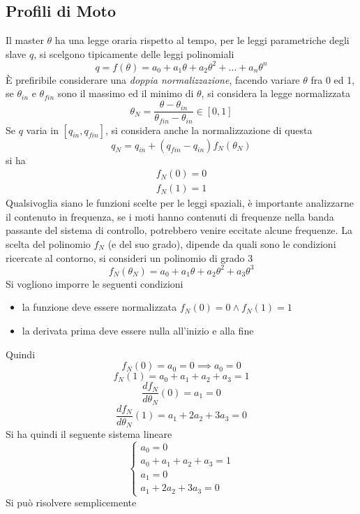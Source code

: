 \documentclass[10pt, letterpaper]{report}
\begin{document}
\subsection{Profili di Moto}
Il master $\theta$ ha una legge oraria rispetto al tempo, per le leggi parametriche degli slave $q$, si scelgono tipicamente delle leggi polinomiali 
$$q=f(\theta)=a_0+a_1\theta+a_2\theta^2+\dots + a_n\theta^n $$
È prefiribile considerare una \textit{doppia normalizzazione}, facendo variare $\theta$ fra 0 ed 1, se $\theta_{in}$ e $\theta_{fin}$ sono il massimo ed il minimo di $\theta$, si considera la legge normalizzata 
$$ \theta_N = \frac{\theta - \theta_{in}}{\theta_{fin}-\theta_{in}}\in [0,1]$$
Se $q$ varia in $[q_{in},q_{fin}]$, si considera anche la normalizzazione di questa 
$$ q_N=q_{in}+(q_{fin}-q_{in})f_N(\theta_N)$$
si ha 
$$\begin{matrix}
    f_N(0)=0\\ f_N(1)=1
\end{matrix} $$
Qualsivoglia siano le funzioni scelte per le leggi spaziali, è importante analizzarne il contenuto in frequenza, se i moti hanno contenuti di frequenze nella banda passante del sistema di controllo, potrebbero venire eccitate alcune frequenze. \acc 
La scelta del polinomio $f_N$ (e del suo grado), dipende da quali sono le condizioni ricercate al contorno, si consideri un polinomio di grado 3
$$ f_N(\theta_N)=a_0+a_1\theta+a_2\theta^2+a_3\theta^3$$
Si vogliono imporre le seguenti condizioni\begin{itemize}
    \item la funzione deve essere normalizzata $f_N(0)=0\land f_N(1)=1$
    \item la derivata prima deve essere nulla all'inizio e alla fine  
\end{itemize}
Quindi 
$$f_N(0)= a_0=0\implies a_0=0$$
$$ f_N(1)=a_0+a_1+a_2+a_3=1$$
$$ \frac{df_N}{d\theta_N}(0)=a_1=0$$
$$ \frac{df_N}{d\theta_N}(1)=a_1+2a_2+3a_3=0$$
Si ha quindi il seguente sistema lineare 
$$ \begin{cases}
    a_0=0\\ 
    a_0+a_1+a_2+a_3=1\\ 
    a_1=0\\ 
    a_1+2a_2+3a_3=0
\end{cases}$$
Si può risolvere semplicemente
\end{document}
